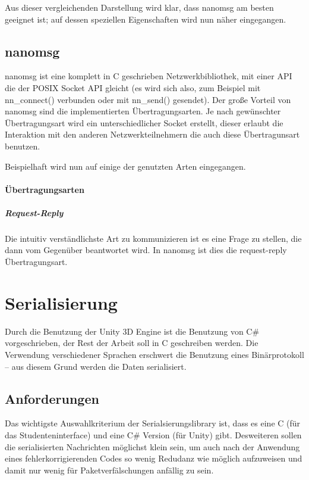 Aus dieser vergleichenden Darstellung wird klar, dass nanomsg am besten geeignet ist; auf dessen speziellen Eigenschaften wird nun n{\"{a}}her eingegangen.

\subsection{nanomsg}
nanomsg ist eine komplett in C geschrieben Netzwerkbibliothek, mit einer API die der POSIX Socket API gleicht (es wird sich also, zum Beispiel mit nn\_connect() verbunden oder mit nn\_send() gesendet).
Der gro{\ss}e Vorteil von nanomsg sind die implementierten {\"{U}}bertragungsarten. Je nach gew{\"{u}}nschter {\"{U}}bertragungsart wird ein unterschiedlicher Socket erstellt, dieser erlaubt die
Interaktion mit den anderen Netzwerkteilnehmern die auch diese {\"{U}}bertragunsart benutzen.

Beispielhaft wird nun auf einige der genutzten Arten eingegangen.

\paragraph{{\"{U}}bertragungsarten}
\subparagraph{Request-Reply} Die intuitiv verst{\"{a}}ndlichste Art zu kommunizieren ist es eine Frage zu stellen, die dann vom Gegen{\"{u}}ber beantwortet wird. In nanomsg ist dies die request-reply
{\"{U}}bertragungsart.

\clearpage
\section{Serialisierung}
Durch die Benutzung der Unity 3D Engine ist die Benutzung von C\# vorgeschrieben, der Rest der Arbeit soll in C geschreiben werden. Die Verwendung verschiedener Sprachen erschwert die Benutzung eines
Bin{\"{a}}rprotokoll -- aus diesem Grund werden die Daten serialisiert.

\subsection{Anforderungen}
Das wichtigste Auswahlkriterium der Serialsierungslibrary ist, dass es eine C (f{\"{u}}r das Studenteninterface) und eine C\# Version (f{\"{u}}r Unity) gibt.
Desweiteren sollen die serialisierten Nachrichten m{\"{o}}glichst klein sein, um auch nach der Anwendung
eines fehlerkorrigierenden Codes so wenig Redudanz wie m{\"{o}}glich aufzuweisen und damit nur wenig f{\"{u}}r Paketverf{\"{a}}lschungen anf{\"{a}}llig zu sein.

